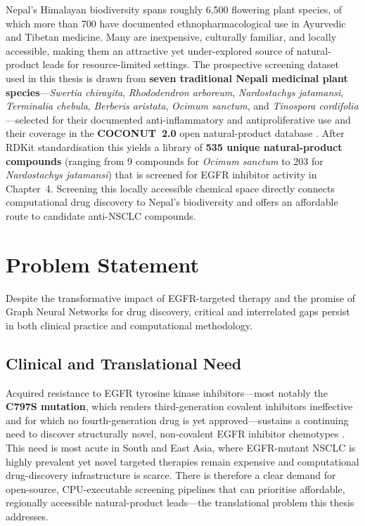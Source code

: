 Nepal's Himalayan biodiversity spans roughly 6,500 flowering plant species, of which
more than 700 have documented ethnopharmacological use in Ayurvedic and Tibetan
medicine. Many are inexpensive, culturally familiar, and locally accessible, making
them an attractive yet under-explored source of natural-product leads for
resource-limited settings. The prospective screening dataset used in this thesis is
drawn from \textbf{seven traditional Nepali medicinal plant species}---\textit{Swertia
chirayita}, \textit{Rhododendron arboreum}, \textit{Nardostachys jatamansi},
\textit{Terminalia chebula}, \textit{Berberis aristata}, \textit{Ocimum sanctum}, and
\textit{Tinospora cordifolia}---selected for their documented anti-inflammatory and
antiproliferative use and their coverage in the \textbf{COCONUT~2.0} open
natural-product database \parencite{sorokina2021coconut}. After RDKit standardisation
this yields a library of \textbf{535 unique natural-product compounds} (ranging from 9
compounds for \textit{Ocimum sanctum} to 203 for \textit{Nardostachys jatamansi}) that
is screened for EGFR inhibitor activity in Chapter~4. Screening this locally accessible
chemical space directly connects computational drug discovery to Nepal's biodiversity
and offers an affordable route to candidate anti-NSCLC compounds.

\section{Problem Statement}

Despite the transformative impact of EGFR-targeted therapy and the promise of
Graph Neural Networks for drug discovery, critical and interrelated gaps persist
in both clinical practice and computational methodology.

\subsection{Clinical and Translational Need}

Acquired resistance to EGFR tyrosine kinase inhibitors---most notably the
\textbf{C797S mutation}, which renders third-generation covalent inhibitors
ineffective and for which no fourth-generation drug is yet approved---sustains a
continuing need to discover structurally novel, non-covalent EGFR inhibitor
chemotypes \parencite{rotow2023egfr}. This need is most acute in South and East Asia,
where EGFR-mutant NSCLC is highly prevalent yet novel targeted therapies remain
expensive and computational drug-discovery infrastructure is scarce. There is
therefore a clear demand for open-source, CPU-executable screening pipelines that can
prioritise affordable, regionally accessible natural-product leads---the translational
problem this thesis addresses.

